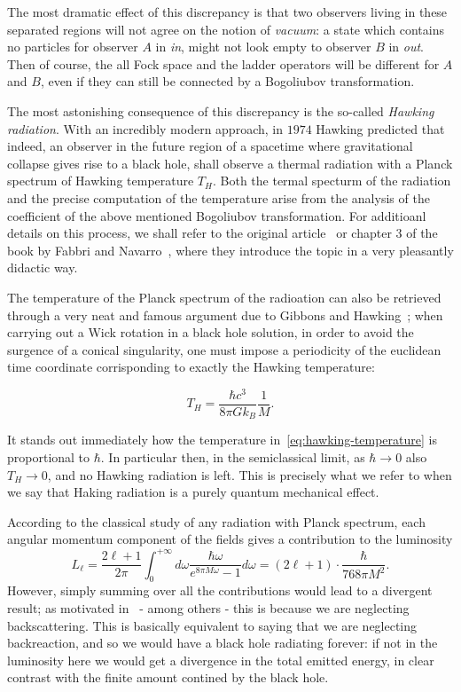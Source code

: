The most dramatic effect of this discrepancy is that two observers living in these separated regions will not agree on the notion of \emph{vacuum}: a state which contains no particles for observer \(A\) in \emph{in}, might not look empty to observer \(B\) in \emph{out}.
Then of course, the all Fock space and the ladder operators will be different for \(A\) and \(B\), even if they can still be connected by a Bogoliubov transformation.

The most astonishing consequence of this discrepancy is the so-called \emph{Hawking radiation}. With an incredibly modern approach, in \(1974\) Hawking predicted that indeed, an observer in the future region of a spacetime where gravitational collapse gives rise to a black hole, shall observe a thermal radiation with a Planck spectrum of Hawking temperature \(T_H\). Both the termal specturm of the radiation and the precise computation of the temperature arise from the analysis of the coefficient of the above mentioned Bogoliubov transformation. For additioanl details on this process, we shall refer to the original article~\cite[]{hawking1975particle} or chapter \(3\) of the book by Fabbri and Navarro~\cite[]{fabbri2005modeling}, where they introduce the topic in a very pleasantly didactic way.

The temperature of the Planck spectrum of the radioation can also be retrieved through a very neat and famous argument due to Gibbons and Hawking~\cite[]{gibbons1993action}; when carrying out a Wick rotation in a black hole solution, in order to avoid the surgence of a conical singularity, one must impose a periodicity of the euclidean time coordinate corrisponding to exactly the Hawking temperature:

\begin{equation}
	\label{eq:hawking-temperature}
	T_H = \frac{\hbar c^3}{8\pi Gk_B}\frac{1}{M}.
\end{equation}

\begin{remark}
	It stands out immediately how the temperature in~\eqref{eq:hawking-temperature} is proportional to \(\hbar\). In particular then, in the semiclassical limit, as \(\hbar \rightarrow 0\) also \(T_H \rightarrow 0\), and no Hawking radiation is left. This is precisely what we refer to when we say that Haking radiation is a purely quantum mechanical effect.
\end{remark}

According to the classical study of any radiation with Planck spectrum, each angular momentum component of the fields gives a contribution to the luminosity
\[
L_{\ell} = \frac{2\ell + 1}{2\pi} \int_0^{+\infty} d\omega \frac{\hbar\omega}{e^{8\pi M\omega} - 1}	d\omega  = (2\ell + 1) \cdot\frac{\hbar}{768\pi M^2}.
\]
However, simply summing over all the contributions would lead to a divergent result; as motivated in~\cite[]{fabbri2005modeling} - among others - this is because we are neglecting backscattering. This is basically equivalent to saying that we are neglecting backreaction, and so we would have a black hole radiating forever: if not in the luminosity here we would get a divergence in the total emitted energy, in clear contrast with the finite amount contined by the black hole.

